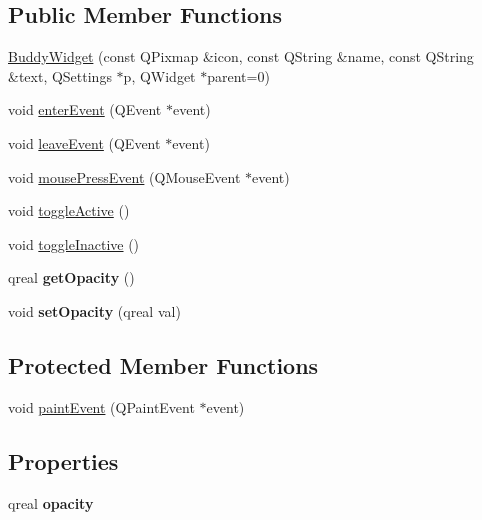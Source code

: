 \subsection*{Public Member Functions}
\begin{DoxyCompactItemize}
\item 
\hyperlink{class_buddy_widget_adbd623b008c65aa0b7a148fecc263710}{Buddy\+Widget} (const Q\+Pixmap \&icon, const Q\+String \&name, const Q\+String \&text, Q\+Settings $\ast$p, Q\+Widget $\ast$parent=0)
\item 
void \hyperlink{class_buddy_widget_a3779931e78f94335f069f47c483e28d3}{enter\+Event} (Q\+Event $\ast$event)
\item 
void \hyperlink{class_buddy_widget_a496d7edf41c9139e85bcf20cdf9aea6c}{leave\+Event} (Q\+Event $\ast$event)
\item 
void \hyperlink{class_buddy_widget_a9b69b6f6ef58b90b345ffb754bebba63}{mouse\+Press\+Event} (Q\+Mouse\+Event $\ast$event)
\item 
void \hyperlink{class_buddy_widget_a639b5917737294f52565e3b464e393a0}{toggle\+Active} ()
\item 
void \hyperlink{class_buddy_widget_ab52f4fb2432dedb66c18e80e282d894c}{toggle\+Inactive} ()
\item 
\hypertarget{class_buddy_widget_a09860a984b8a8dd674a714b3fe7cf1b5}{}qreal {\bfseries get\+Opacity} ()\label{class_buddy_widget_a09860a984b8a8dd674a714b3fe7cf1b5}

\item 
\hypertarget{class_buddy_widget_a7b68f49546a10fcbd1d30553ea1b801b}{}void {\bfseries set\+Opacity} (qreal val)\label{class_buddy_widget_a7b68f49546a10fcbd1d30553ea1b801b}

\end{DoxyCompactItemize}
\subsection*{Protected Member Functions}
\begin{DoxyCompactItemize}
\item 
void \hyperlink{class_buddy_widget_a61f6d8d680ffea3ed7efc8889f0e5236}{paint\+Event} (Q\+Paint\+Event $\ast$event)
\end{DoxyCompactItemize}
\subsection*{Properties}
\begin{DoxyCompactItemize}
\item 
\hypertarget{class_buddy_widget_a10b9b549e1a7f311026a06805bf1f6c3}{}qreal {\bfseries opacity}\label{class_buddy_widget_a10b9b549e1a7f311026a06805bf1f6c3}

\end{DoxyCompactItemize}



